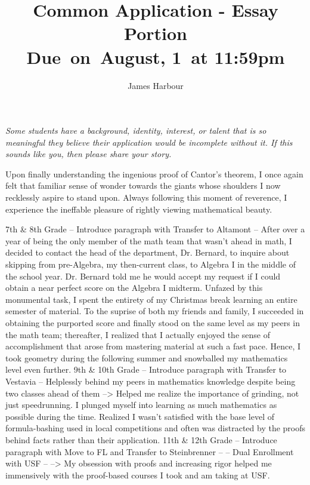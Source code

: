 \documentclass[12pt]{article}
\title{
    \vspace{2in}
    \textmd{\textbf{Common Application - Essay Portion}}\\
    \normalsize\vspace{0.1in}\small{Due\ on\  August, 1\ at 11:59pm}\\
    \vspace{3in}
}
\author{James Harbour}
\begin{document}
\maketitle
\pagebreak
 \begin{center}

   \emph{Some students have a background, identity, interest, or talent that is so meaningful they believe their application would be incomplete without it. If this sounds like you, then please share your story.}
 \end{center}
\raggedright\setlength{\parindent}{0.5in}

Upon finally understanding the ingenious proof of Cantor’s theorem, I once again felt that familiar sense of wonder towards the giants whose shoulders I now recklessly aspire to stand upon. Always following this moment of reverence, I experience the ineffable pleasure of rightly viewing mathematical beauty.

\begin{outline}[enumerate]
  \1 7th \& 8th Grade
    \2 -- Introduce paragraph with Transfer to Altamont --
    \2 After over a year of being the only member of the math team that wasn't ahead in math, I decided to contact the head of the department, Dr. Bernard, to inquire about skipping from pre-Algebra, my then-current class, to Algebra I in the middle of the school year.
    \2 Dr. Bernard told me he would accept my request if I could obtain a near perfect score on the Algebra I midterm. Unfazed by this monumental task, I spent the entirety of my Christmas break learning an entire semester of material. To the suprise of both my friends and family, I succeeded in obtaining the purported score and finally stood on the same level as my peers in the math team; thereafter, I realized that I actually enjoyed the sense of accomplishment that arose from mastering material at such a fast pace. Hence, I took geometry during the following summer and snowballed my mathematics level even further.
  \1 9th \& 10th Grade
    \2 -- Introduce paragraph with Transfer to Vestavia --
    \2 Helplessly behind my peers in mathematics knowledge despite being two classes ahead of them
    \2 --> Helped me realize the importance of grinding, not just speedrunning.
    \2 I plunged myself into learning as much mathematics as possible during the time.
    \2 Realized I wasn't satisfied with the base level of formula-bashing used in local competitions and often was distracted by the proofs behind facts rather than their application.
  \1 11th \& 12th Grade
    \2 -- Introduce paragraph with Move to FL and Transfer to Steinbrenner --
    \2 -- Dual Enrollment with USF --
    \2 --> My obsession with proofs and increasing rigor helped me immensively with the proof-based courses I took and am taking at USF.
\end{outline}
\end{document}
